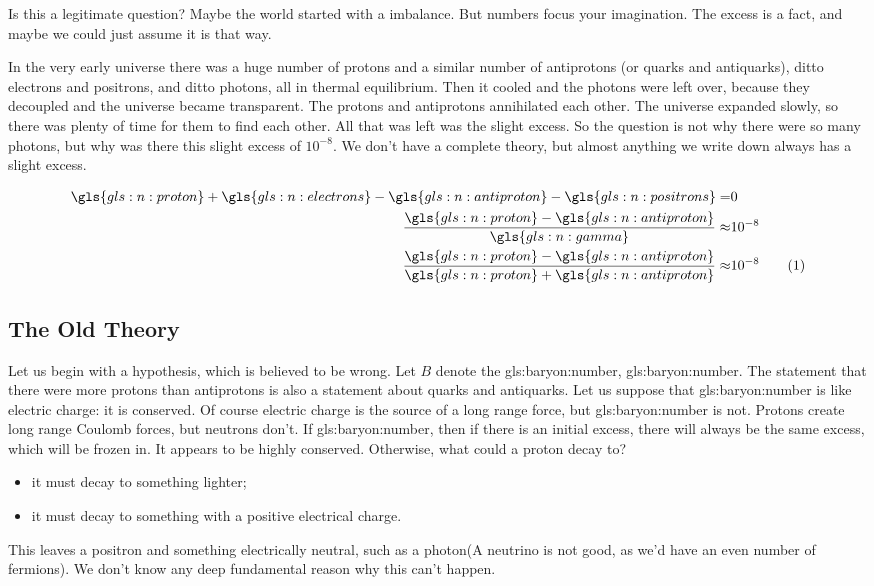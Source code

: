 \documentclass[]{article}
\newcommand\numberthis{\addtocounter{equation}{1}\tag{\theequation}}
\begin{document}
Is this a legitimate question? Maybe the world started with a imbalance. But numbers focus your imagination. The excess is  a fact, and maybe we could just assume it is that way.

In the very early universe there was a huge number of protons and a similar number of antiprotons (or quarks and antiquarks), ditto electrons and positrons, and ditto photons, all in thermal equilibrium. Then it cooled and the photons were left over, because they decoupled and the universe became transparent. The protons and antiprotons annihilated each other. The universe expanded slowly, so there was plenty of time for them to find each other. All that was left was the slight excess. So the question is not why there were so many photons, but why was there this slight excess of $10^{-8}$. We don't have a complete theory, but almost anything we write down always has a slight excess.

\begin{align*}
	\gls{gls:n:proton}+\gls{gls:n:electrons}-\gls{gls:n:antiproton}-\gls{gls:n:positrons} =& 0\\
	\frac{\gls{gls:n:proton}-\gls{gls:n:antiproton}}{\gls{gls:n:gamma}}\approx&10^{-8}\\
	\frac{\gls{gls:n:proton}-\gls{gls:n:antiproton}}{\gls{gls:n:proton}+\gls{gls:n:antiproton}}\approx&10^{-8} \numberthis \label{eq:p:ap}
\end{align*}

\subsection{The Old Theory}

Let us begin with a hypothesis, which is believed to be wrong. Let $B$ denote the \gls{gls:baryon:number}, \glsdesc{gls:baryon:number}. The statement that there were more protons than antiprotons is also a statement about quarks and antiquarks.
Let us suppose that \gls{gls:baryon:number} is like electric charge: it is conserved. Of course electric charge is the source of a long range force, but \gls{gls:baryon:number} is not. Protons create long range Coulomb forces, but neutrons don't. If \gls{gls:baryon:number}, then if there is an initial excess, there will always be the same excess, which will be frozen in. It appears to be highly conserved. Otherwise, what could a proton decay to?
\begin{itemize}
	\item it must decay to something lighter;
	\item it must decay to something with a positive electrical charge.
\end{itemize}
This leaves a positron and something electrically neutral, such as a photon(A neutrino is not good, as we'd have an even number of fermions). We don't know any deep fundamental reason why this can't happen.
\end{document}
